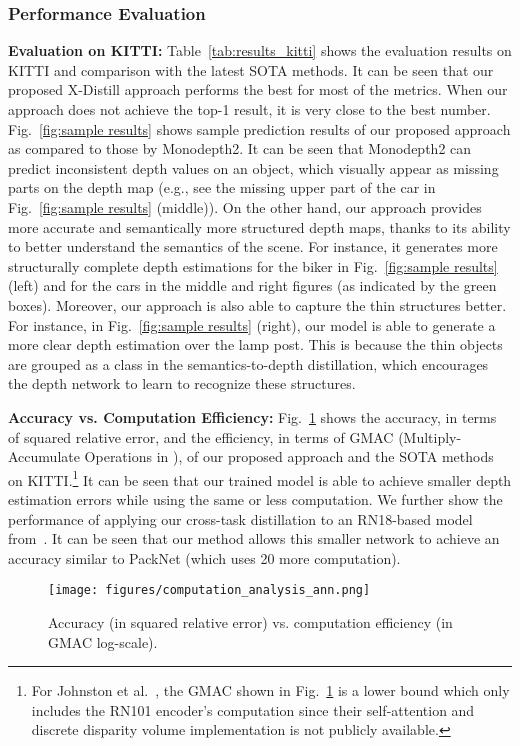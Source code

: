 \documentclass{bmvc2k}
\begin{document}
\vspace{-10pt}
\subsubsection{Performance Evaluation}
\vspace{-7pt}
\noindent \textbf{Evaluation on KITTI:}
Table~\ref{tab:results_kitti} shows the evaluation results on KITTI and comparison with the latest SOTA methods. It can be seen that our proposed X-Distill approach performs the best for most of the metrics. When our approach does not achieve the top-1 result, it is very close to the best number. Fig.~\ref{fig:sample results} shows sample prediction results of our proposed approach as compared to those by Monodepth2. It can be seen that Monodepth2 can predict inconsistent depth values on an object, which visually appear as missing parts on the depth map (e.g., see the missing upper part of the car in Fig.~\ref{fig:sample results} (middle)). On the other hand, our approach provides more accurate and semantically more structured depth maps, thanks to its ability to better understand the semantics of the scene. For instance, it generates more structurally complete depth estimations for the biker in Fig.~\ref{fig:sample results} (left) and for the cars in the middle and right figures (as indicated by the green boxes). Moreover, our approach is also able to capture the thin structures better. For instance, in Fig.~\ref{fig:sample results} (right), our model is able to generate a more clear depth estimation over the lamp post. This is because the thin objects are grouped as a class in the semantics-to-depth distillation, which encourages the depth network to learn to recognize these structures.

\vspace{1pt}
\noindent \textbf{Accuracy vs. Computation Efficiency:} Fig.~\ref{fig:computation} shows the accuracy, in terms of squared relative error, and the efficiency, in terms of GMAC (Multiply-Accumulate Operations in ), of our proposed approach and the SOTA methods on KITTI.\footnote{For Johnston et al.~\cite{johnston2020self}, the GMAC shown in Fig.~\ref{fig:computation} is a lower bound which only includes the RN101 encoder's computation since their self-attention and discrete disparity volume implementation is not publicly available.} It can be seen that our trained model is able to achieve smaller depth estimation errors while using the same or less computation. We further show the performance of applying our cross-task distillation to an RN18-based model from~\cite{godard2019digging}. It can be seen that our method allows this smaller network to achieve an accuracy similar to PackNet (which uses 20 more computation).
\begin{figure}[h]
\vspace{-14pt}
\centering
\texttt{[image: figures/computation\_analysis\_ann.png]}
\vspace{-17pt}
\caption{\small Accuracy (in squared relative error) vs. computation efficiency (in GMAC log-scale).} 
\label{fig:computation}
\vspace{-8pt}
\end{figure}
\end{document}

